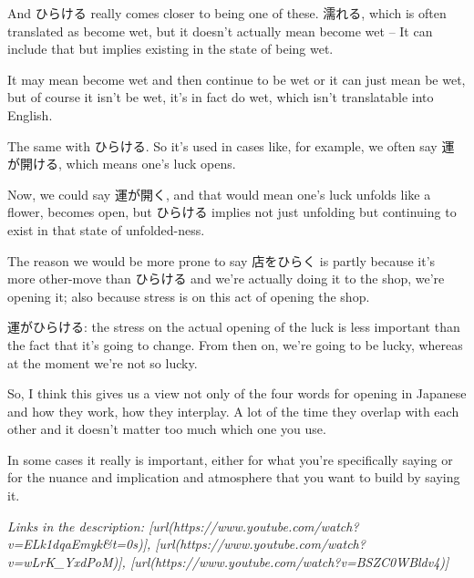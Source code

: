 And ひらける really comes closer to being one of these. 濡れる, which is often translated as become wet, but it doesn't actually mean become wet -- It can include that but implies existing in the state of being wet.

It may mean become wet and then continue to be wet or it can just mean be wet, but of course it isn't be wet, it's in fact do wet, which isn't translatable into English.

The same with ひらける. So it's used in cases like, for example, we often say 運が開ける, which means one's luck opens.

{}

Now, we could say 運が開く, and that would mean one's luck unfolds like a flower, becomes open, but ひらける implies not just unfolding but continuing to exist in that state of unfolded-ness.

The reason we would be more prone to say 店をひらく is partly because it's more other-move than ひらける and we're actually doing it to the shop, we're opening it; also because stress is on this act of opening the shop.

運がひらける: the stress on the actual opening of the luck is less important than the fact that it's going to change. From then on, we're going to be lucky, whereas at the moment we're not so lucky.

So, I think this gives us a view not only of the four words for opening in Japanese and how they work, how they interplay. A lot of the time they overlap with each other and it doesn't matter too much which one you use.

In some cases it really is important, either for what you're specifically saying or for the nuance and implication and atmosphere that you want to build by saying it.

{\em Links in the description: [url(https://www.youtube.com/watch?v=ELk1dqaEmyk&t=0s)], [url(https://www.youtube.com/watch?v=wLrK_YxdPoM)], [url(https://www.youtube.com/watch?v=BSZC0WBldv4)]}

\stopsectionlevel

\stopsectionlevel
